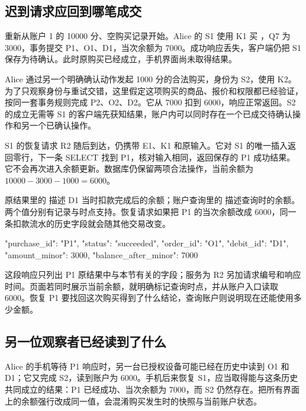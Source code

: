\subsection*{迟到请求应回到哪笔成交}

重新从账户 1 的 10000 分、空购买记录开始。Alice 的 S1 使用 K1 买 ，Q7 为 3000，事务提交 P1、O1、D1，当次余额为 7000。成功响应丢失，客户端仍把 S1 保存为待确认。此时原购买已经成立，手机界面尚未取得结果。

Alice 通过另一个明确确认动作发起 1000 分的合法购买，身份为 S2，使用 K2。为了只观察身份与重试交错，这里假定这项购买的商品、报价和权限都已经验证，按同一套事务规则完成 P2、O2、D2。它从 7000 扣到 6000，响应正常返回。S2 的成立无需等 S1 的客户端先获知结果，账户内可以同时存在一个已成交待确认操作和另一个已确认操作。

S1 的恢复请求 R2 随后到达，仍携带 E1、K1 和原输入。它对 S1 的唯一插入返回零行，下一条 SELECT 找到 P1，核对输入相同，返回保存的 P1 成功结果。它不会再次进入余额更新。数据库仍保留两项合法操作，当前余额为 \(10000-3000-1000=6000\)。



原结果里的  描述 D1 当时扣款完成后的余额；账户查询里的  描述查询时的余额。两个值分别有记录与时点支持。恢复请求如果把 P1 的当次余额改成 6000，同一条扣款流水的历史字段就会随其他交易改变。

\begin{BookCode}
{
  "purchase_id": "P1",
  "status": "succeeded",
  "order_id": "O1",
  "debit_id": "D1",
  "amount_minor": 3000,
  "balance_after_minor": 7000
}
\end{BookCode}

这段响应只列出 P1 原结果中与本节有关的字段；服务为 R2 另加请求编号和响应时间。页面若同时展示当前余额，就明确标记查询时点，并从账户入口读取 6000。恢复 P1 要找回这次购买得到了什么结论，查询账户则说明现在还能使用多少金额。

\subsection*{另一位观察者已经读到了什么}

Alice 的手机等待 P1 响应时，另一台已授权设备可能已经在历史中读到 O1 和 D1；它又完成 S2，读到账户为 6000。手机后来恢复 S1，应当取得能与这条历史共同成立的结果：P1 已经成功、当次余额为 7000，而 S2 仍然存在。把所有界面上的余额强行改成同一值，会混淆购买发生时的快照与当前账户状态。

